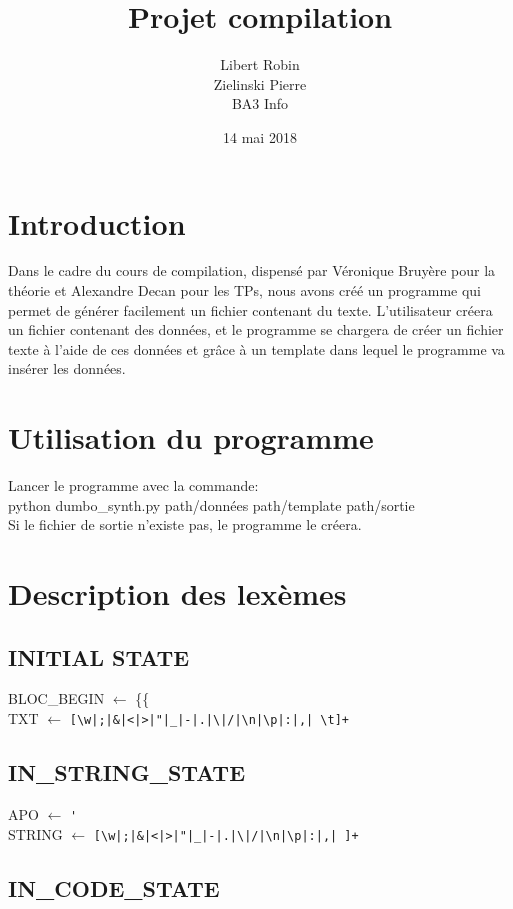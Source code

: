 ﻿\documentclass{report}
\title{Projet compilation}
\author{Libert Robin\\ Zielinski Pierre \\ BA3 Info}
\date{14 mai 2018}
\begin{document}
\maketitle

\section*{ Introduction}
Dans le cadre du cours de compilation, dispensé par Véronique Bruyère pour la théorie et Alexandre Decan pour les TPs, nous avons créé un programme qui permet de générer facilement un fichier contenant du texte. L'utilisateur créera un fichier contenant des données, et le programme se chargera de créer un fichier texte à l'aide de ces données et grâce à un template dans lequel le programme va insérer les données.

\section*{ Utilisation du programme}
Lancer le programme avec la commande:\\
python dumbo\_synth.py path/données path/template path/sortie\\
Si le fichier de sortie n'existe pas, le programme le créera.

\section*{ Description des lexèmes}

\subsection*{INITIAL STATE}

BLOC\_BEGIN $\leftarrow$ \{\{\\

TXT $\leftarrow$ \verb![\w|;|&|<|>|"|_|-|.|\|/|\n|\p|:|,| \t]+!

\subsection*{IN\_STRING\_STATE}

APO $\leftarrow$ \verb!'!\\

STRING $\leftarrow$ \verb![\w|;|&|<|>|"|_|-|.|\|/|\n|\p|:|,| ]+!

\subsection*{IN\_CODE\_STATE}
\end{document}
